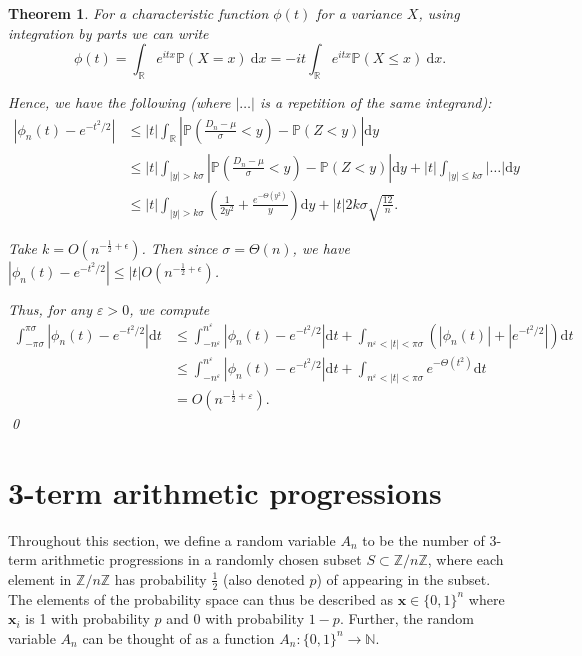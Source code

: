 \documentclass[12pt]{article} %
\newcommand{\f}[2]{\frac{#1}{#2}}
\newcommand{\p}[1]{\left(#1\right)}
\newcommand{\abs}[1]{\left\lvert#1\right\rvert}
\newcommand{\R}{\mathbb{R}}
\renewcommand{\P}{\mathbb{P}}
\newcommand{\bbn}{\mathbb{N}}
\newcommand{\Z}{\mathbb{Z}}
\newcommand{\bfx}{\mathbf{x}}
\renewcommand{\d}{\mathrm{d}}
\newcommand{\eps}{\varepsilon}
\newtheorem{thm}{Theorem}[section]
\theoremstyle{definition}
\theoremstyle{definition}
\begin{document}
\begin{thm}
For a characteristic function $\phi(t)$ for a variance $X$, using integration by parts we can write
\[
\phi(t)
= \int_\R e^{itx} \P(X = x)\ \d x
= -it \int_\R e^{itx} \P(X \leq x)\ \d x.
\]

Hence, we have the following (where $\abs{\ldots}$ is a repetition of the same integrand):
\begin{align*}
\abs{\phi_n(t) - e^{-t^2/2}} &\leq \abs{t} \int_\R \abs{\P\p{\f{D_n - \mu}{\sigma} < y} - \P(Z < y)} \d y  \\
&\leq |t| \int_{|y|>k\sigma} \abs{\P\p{\f{D_n - \mu}{\sigma} < y} - \P(Z < y)} \d y + |t| \int_{|y| \leq k\sigma} \abs{\ldots} \d y \\
&\leq |t| \int_{|y|>k\sigma} \p{\frac{1}{2y^2} + \frac{e^{-\Theta(y^2)}}{y}} \d y + |t|2k\sigma \sqrt{\frac{12}{n}}.
\end{align*}

Take $k = O(n^{-\frac{1}{2} + \epsilon})$. Then since $\sigma = \Theta(n)$, we have $\abs{\phi_n(t) - e^{-t^2/2}} \leq |t|O(n^{-\frac{1}{2} + \epsilon})$.

	Thus, for any $\eps > 0$, we compute
	\begin{align*}
		\int_{-\pi \sigma}^{\pi \sigma} \abs{\phi_n(t) - e^{-t^2/2}} \d t
		&\leq \int_{-n^\eps}^{n^\eps} \abs{\phi_n(t) - e^{-t^2/2}} \d t + \int_{n^\eps < \abs{t} < \pi \sigma} (\abs{\phi_n(t)} + |e^{-t^2/2}|) \d t \\
		&\leq \int_{-n^\eps}^{n^\eps} \abs{\phi_n(t) - e^{-t^2/2}} \d t + \int_{n^\eps < \abs{t} < \pi \sigma} e^{-\Theta(t^2)} \d t \\
		&= O(n^{-\f{1}{2} + \eps}).
	\end{align*}
    \qed
    \end{thm}

\section{3-term arithmetic progressions}

Throughout this section, we define a random variable $A_n$ to be the number of 3-term arithmetic progressions in a randomly chosen subset $S \subset \Z / n\Z$, where each element in $\Z / n\Z$ has probability $\f{1}{2}$ (also denoted $p$) of appearing in the subset. The elements of the probability space can thus be described as $\bfx \in \{0,1\}^n$ where $\bfx_i$ is 1 with probability $p$ and 0 with probability $1-p$. Further, the random variable $A_n$ can be thought of as a function $A_n : \{0,1\}^n \to \bbn$.
\end{document}
